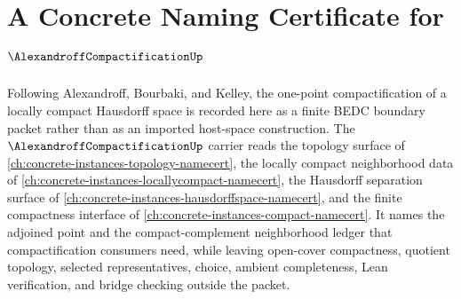 \chapter{A Concrete Naming Certificate for $\AlexandroffCompactificationUp$}
\label{ch:concrete-instances-alexandroff-compactification-namecert}

Following Alexandroff, Bourbaki, and Kelley, the one-point compactification of a locally compact Hausdorff space is recorded here as a finite BEDC boundary packet rather than as an imported host-space construction. The $\AlexandroffCompactificationUp$ carrier reads the topology surface of \autoref{ch:concrete-instances-topology-namecert}, the locally compact neighborhood data of \autoref{ch:concrete-instances-locallycompact-namecert}, the Hausdorff separation surface of \autoref{ch:concrete-instances-hausdorffspace-namecert}, and the finite compactness interface of \autoref{ch:concrete-instances-compact-namecert}. It names the adjoined point and the compact-complement neighborhood ledger that compactification consumers need, while leaving open-cover compactness, quotient topology, selected representatives, choice, ambient completeness, Lean verification, and bridge checking outside the packet.

